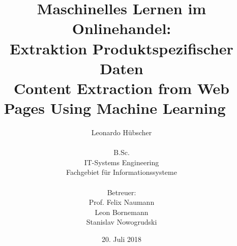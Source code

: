 \titlehead{
\vspace*{2cm}
\centering \texttt{[image: resources/hpi-logo.pdf]}
}
\subject{Bachelorarbeit}
\title{
Maschinelles Lernen im Onlinehandel: \\
Extraktion Produktspezifischer Daten \\
\bigskip
\large{Content Extraction from Web Pages Using Machine Learning}
\medskip ~\\
}
\author{
Leonardo Hübscher\\
\\B.Sc.\\
IT-Systems Engineering\\
Fachgebiet für Informationssysteme \\
\bigskip ~\\
Betreuer:\\
Prof. Felix Naumann\\
Leon Bornemann\\
Stanislav Nowogrudski
}
\date{20. Juli 2018}